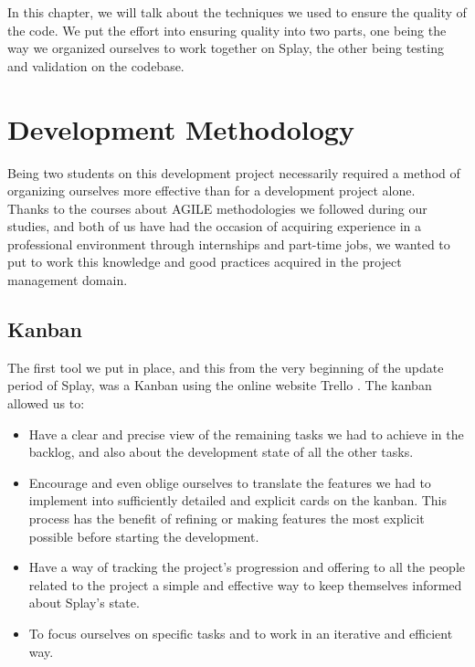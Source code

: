 \documentclass{eplmastersthesis}
\begin{document}
    In this chapter, we will talk about the techniques we used to ensure the
    quality of the code. We put the effort into ensuring quality into two
    parts, one being the way we organized ourselves to work together on Splay,
    the other being testing and validation on the codebase.

    \section{Development Methodology}

      Being two students on this development project necessarily required a 
      method of organizing ourselves more effective than for a development 
      project alone.\\

      Thanks to the courses about AGILE methodologies we followed during our
      studies, and both of us have had the occasion of acquiring
      experience in a professional environment through internships and part-time jobs,
      we wanted to put to work this knowledge and good practices acquired in
      the project management domain.

        \subsection{Kanban}

          The first tool we put in place, and this from the very beginning of
          the update period of Splay, was a Kanban using the online website
          Trello \cite{trello}. The kanban allowed us to: \\

          \begin{itemize}
            \item Have a clear and precise view of the remaining tasks we had
            to achieve in the backlog, and also about the development state of
            all the other tasks.
            \item Encourage and even oblige ourselves to translate the features
            we had to implement into sufficiently detailed and explicit cards on
            the kanban. This process has the benefit of refining or making
            features the most explicit possible before starting the development.
            \item Have a way of tracking the project's progression and offering
            to all the people related to the project a simple and effective way
            to keep themselves informed about Splay's state.
            \item To focus ourselves on specific tasks and to work in an
            iterative and efficient way.
          \end{itemize}
\end{document}
